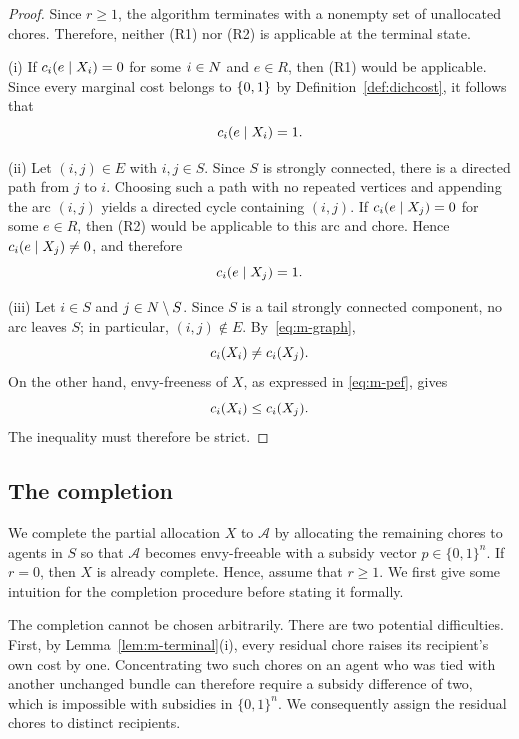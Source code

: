 \begin{proof}
Since $r\geq 1$, the algorithm terminates with a nonempty set of unallocated chores.
Therefore, neither \textnormal{(R1)} nor \textnormal{(R2)} is applicable
at the terminal state.

(i) If $c_i(e\mid X_i)=0$ for some $i\in N$ and $e\in R$,
then \textnormal{(R1)} would be applicable. Since every marginal cost
belongs to $\left\{0,1\right\}$ by Definition~\ref{def:dichcost}, it follows that
\[
    c_i(e\mid X_i)=1.
\]

(ii) Let $(i,j)\in E$ with $i,j\in S$. Since $S$ is strongly connected,
there is a directed path from $j$ to $i$. Choosing such a path with no
repeated vertices and appending the arc $(i,j)$ yields a directed cycle
containing $(i,j)$. If $c_i(e\mid X_j)=0$ for some $e\in R$, then
\textnormal{(R2)} would be applicable to this arc and chore. Hence
$c_i(e\mid X_j)\neq 0$, and therefore
\[
    c_i(e\mid X_j)=1.
\]

(iii) Let $i\in S$ and $j\in N\setminus S$. Since $S$ is a tail
strongly connected component, no arc leaves $S$; in particular,
$(i,j)\notin E$. By~\eqref{eq:m-graph},
\[
    c_i(X_i)\neq c_i(X_j).
\]
On the other hand, envy-freeness of $X$, as expressed in
\eqref{eq:m-pef}, gives
\[
    c_i(X_i)\leq c_i(X_j).
\]
The inequality must therefore be strict.
\end{proof}
\subsection{The completion}
\label{sec:m-completion}
We complete the partial allocation $X$ to $\mathcal{A}$ by allocating the remaining chores to agents in $S$ so that $\mathcal{A}$ becomes envy-freeable with a subsidy vector $p\in\{0,1\}^n$. If $r=0$, then $X$ is already complete. Hence, assume that $r\geq 1$. We first give some intuition for the completion procedure before stating it formally.

The completion cannot be chosen arbitrarily. There are two potential difficulties. First, by Lemma~\ref{lem:m-terminal}(i), every residual chore raises its recipient's own cost by one. Concentrating two such chores on an agent who was tied with another unchanged bundle can therefore require a subsidy difference of two, which is impossible with subsidies in $\{0,1\}^n$. We consequently assign the residual chores to distinct recipients.

